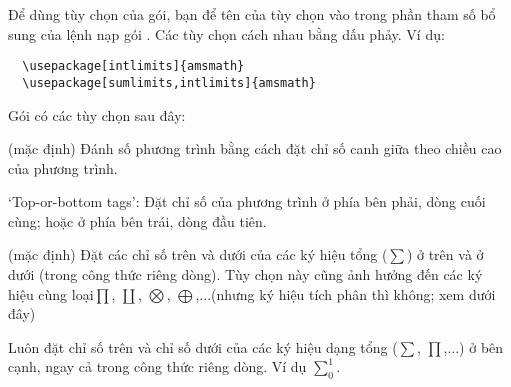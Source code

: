 Để dùng tùy chọn của gói, bạn để tên của tùy chọn vào trong phần tham
số bổ sung của lệnh nạp gói . Các tùy chọn cách nhau bằng
dấu phảy. Ví dụ:

\medskip
\begin{verbatim}
  \usepackage[intlimits]{amsmath}
  \usepackage[sumlimits,intlimits]{amsmath}
\end{verbatim}

\medskip
Gói  có các tùy chọn sau đây:

\medskip
\begin{lentry}
\item[\opt{centertags}] (mặc định)
Đánh số phương trình
bằng cách đặt chỉ số canh giữa theo chiều cao của phương trình.

\item[\opt{tbtags}]%
`Top-or-bottom tags': Đặt chỉ số của phương trình ở phía bên phải,
dòng cuối cùng; hoặc ở phía bên trái, dòng đầu tiên.

\item[\opt{sumlimits}] (mặc định)%
Đặt các chỉ số trên và dưới của các ký hiệu tổng ($\sum$) ở trên và
ở dưới (trong công thức riêng dòng). Tùy chọn này cũng ảnh hưởng
đến các ký hiệu cùng loại\mdash $\prod$, $\coprod$, $\bigotimes$,
$\bigoplus$,...\mdash (nhưng ký hiệu tích phân thì không; xem dưới đây)

\item[\opt{nosumlimits}]%
Luôn đặt chỉ số trên và chỉ số dưới của các ký hiệu dạng tổng ($\sum$, $\prod$,...)
ở bên cạnh, ngay cả trong công thức riêng dòng. Ví dụ $\sum_0^1$.


\end{lentry}
